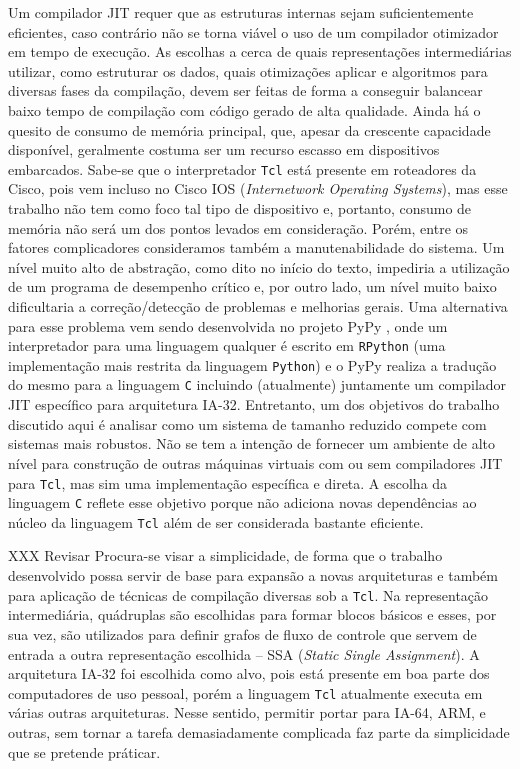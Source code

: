 Um compilador JIT requer que as estruturas internas sejam
suficientemente eficientes, caso contrário não se torna viável o
uso de um compilador otimizador em tempo de execução. As escolhas a
cerca de quais representações intermediárias utilizar, como estruturar
os dados, quais otimizações aplicar e algoritmos para diversas fases da
compilação, devem ser feitas de forma a conseguir balancear baixo
tempo de compilação com código gerado de alta qualidade. Ainda há o
quesito de consumo de memória principal, que, apesar da crescente
capacidade disponível, geralmente costuma ser um recurso escasso em
dispositivos embarcados. Sabe-se que o interpretador \texttt{Tcl} está
presente em roteadores da Cisco, pois vem incluso no Cisco IOS
(\textit{Internetwork Operating Systems}), mas esse trabalho
não tem como foco tal tipo de dispositivo e, portanto, consumo de
memória não será um dos pontos levados em consideração. Porém, entre
os fatores complicadores consideramos também a manutenabilidade do
sistema. Um nível muito alto de abstração, como dito no início do
texto, impediria a utilização de um programa de desempenho crítico e,
por outro lado, um nível muito baixo dificultaria a correção/detecção de
problemas e melhorias gerais.
Uma alternativa para esse problema vem sendo desenvolvida no
projeto PyPy \cite{pypy}, onde um interpretador para uma linguagem
qualquer é escrito em \texttt{RPython} (uma implementação mais
restrita da linguagem \texttt{Python}) e o PyPy realiza a tradução do
mesmo para a
linguagem \texttt{C} incluindo (atualmente) juntamente um compilador
JIT específico para arquitetura IA-32. Entretanto, um
dos objetivos do trabalho discutido aqui é analisar como um sistema de
tamanho reduzido compete com sistemas mais robustos. Não se tem a
intenção de fornecer um ambiente de alto nível para construção de
outras máquinas virtuais com ou sem compiladores JIT para
\texttt{Tcl}, mas sim uma implementação específica e direta.
A escolha da
linguagem \texttt{C} reflete esse objetivo porque não adiciona novas
dependências ao núcleo da linguagem \texttt{Tcl} além de ser
considerada bastante eficiente.

XXX Revisar
Procura-se visar a simplicidade, de forma que o trabalho desenvolvido
possa servir de base para expansão a novas arquiteturas e também para
aplicação de técnicas de compilação diversas sob a
\texttt{Tcl}. Na representação intermediária, quádruplas são
escolhidas para formar blocos básicos e
esses, por sua vez, são utilizados para definir grafos de fluxo de
controle que servem de entrada a outra representação escolhida -- SSA
(\textit{Static Single Assignment}). A arquitetura IA-32 foi escolhida
como alvo, pois está presente em boa parte dos computadores de uso
pessoal, porém a linguagem \texttt{Tcl} atualmente executa em várias
outras arquiteturas. Nesse sentido, permitir portar para IA-64, ARM, e
outras, sem tornar a tarefa demasiadamente complicada faz parte da
simplicidade que se pretende práticar.


